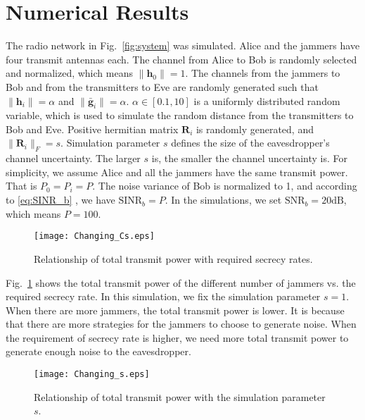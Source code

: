 \documentclass[12pt, journal,onecolumn,draftclsnofoot]{IEEEtran}
\begin{document}
\section{Numerical Results} \label{sec:numerical results}
The radio network in Fig.~\ref{fig:system} was simulated. Alice and the jammers have four transmit antennas each. The channel from Alice to Bob is randomly selected and normalized, which means $\|\mathbf{h}_0\| = 1$. The channels from the jammers to Bob and from the transmitters to Eve are randomly generated such that $\|\mathbf{h}_i\| = \alpha$ and $\|\bar{\mathbf{g}}_i\| = \alpha$. $\alpha \in  [0.1,10]$ is a uniformly distributed random variable, which is used to simulate the random distance from the transmitters to Bob and Eve. Positive hermitian matrix $\mathbf{R}_i$ is randomly generated, and $\|\mathbf{R}_i\|_F = s$. Simulation parameter $s$ defines the size of the eavesdropper's channel uncertainty. The larger $s$ is, the smaller the channel uncertainty is. 
For simplicity, we assume Alice and all the jammers have the same transmit power. That is $P_0=P_i = P$. The noise variance of Bob is normalized to 1,  and according to \eqref{eq:SINR_b} , we have $\mathrm{SINR}_b = P$. In the simulations, we set $\mathrm{SNR}_b = 20 \mathrm{dB}$, which means $P = 100$.


\begin{figure}[!ht]
	\centering
	\texttt{[image: Changing\_Cs.eps]} %
	\caption{Relationship of total transmit power with required secrecy rates.}
	\label{fig:Changing_Cs}
\end{figure}

Fig.~\ref{fig:Changing_Cs} shows the total transmit power of the different number of jammers vs. the required secrecy rate. In this simulation, we fix the simulation parameter $s = 1$. When there are more jammers, the total transmit power is lower. It is because that there are more strategies for the jammers to choose to generate noise. When the requirement of secrecy rate is higher, we need more total transmit power to generate enough noise to the eavesdropper. %

\begin{figure}[!ht]
	\centering
	\texttt{[image: Changing\_s.eps]} %
	\caption{Relationship of total transmit power with the simulation parameter $s$.}
	\label{fig:Changing_s}
\end{figure}
\end{document}
